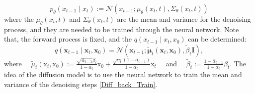 \documentclass{article}
\begin{document}
\begin{equation} \label{Diff_back_Train}
p_\theta\left(x_{t-1} \mid x_t\right):=\mathcal{N}\left(x_{t-1} ; \mu_\theta\left(x_t, t\right), \Sigma_\theta\left(x_t, t\right)\right)
\end{equation}
where the $\mu_\theta\left(x_t, t\right)$ and $\Sigma_\theta\left(x_t, t\right)$ are the mean and variance for the denoising process, and they are needed to be trained through the neural network. Note that, the forward process is fixed, and the $q\left(x_{t-1} \mid x_t, x_0\right)$ can be determined:
\begin{equation} \label{Diff_foward_known}
q\left(\mathbf{x}_{t-1} \mid \mathbf{x}_t, \mathbf{x}_0\right)=\mathcal{N}\left(\mathbf{x}_{t-1} ; \tilde{\boldsymbol{\mu}}_t\left(\mathbf{x}_t, \mathbf{x}_0\right), \tilde{\beta}_t \mathbf{I}\right),
\end{equation}
where $\quad \tilde{\mu}_t\left(\mathrm{x}_t, \mathrm{x}_0\right):=\frac{\sqrt{\bar{\alpha}_{t-1}} \beta_t}{1-\bar{\alpha}_t} \mathrm{x}_0+\frac{\sqrt{\alpha_t}\left(1-\bar{\alpha}_{t-1}\right)}{1-\bar{\alpha}_t} \mathrm{x}_t \quad$ and $\quad \tilde{\beta}_t:=\frac{1-\bar{\alpha}_{t-1}}{1-\bar{\alpha}_t} \beta_t$. 
The idea of the diffusion model is to use the neural network to train the mean and variance of the denoising steps \eqref{Diff_back_Train}. 
\end{document}
